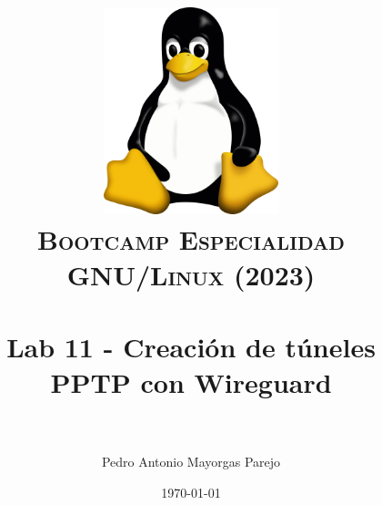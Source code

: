 

\graphicspath{ {img/} }

\title{
\normalfont \normalsize
\includegraphics[width=6cm,height=6cm]{logo}\\
\textsc{\textbf{Bootcamp Especialidad GNU/Linux (2023)}} \\ [25pt] %
\horrule{0.5pt} \\[0.4cm] %
\huge Lab 11 - Creación de túneles PPTP con Wireguard \\ %
\horrule{2pt} \\[0.5cm] %
}



\author{Pedro Antonio Mayorgas Parejo} %

\date{\normalsize\today} %




\maketitle %

\newpage %

\tableofcontents %

\newpage


